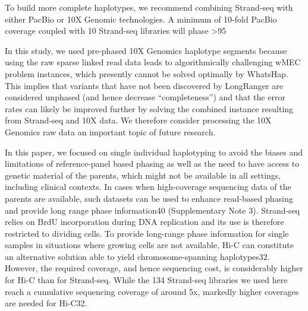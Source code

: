 	To build more complete haplotypes, we recommend combining Strand-seq with either PacBio or 10X Genomic technologies. A minimum of 10-fold PacBio coverage coupled with 10 Strand-seq libraries will phase >95%

	In this study, we used pre-phased 10X Genomics haplotype segments because using the raw sparse linked read data leads to algorithmically challenging wMEC problem instances, which presently cannot be solved optimally by WhatsHap. This implies that variants that have not been discovered by LongRanger are considered unphased (and hence decrease “completeness”) and that the error rates can likely be improved further by solving the combined instance resulting from Strand-seq and 10X data. We therefore consider processing the 10X Genomics raw data an important topic of future research.

	In this paper, we focused on single individual haplotyping to avoid the biases and limitations of reference-panel based phasing as well as the need to have access to genetic material of the parents, which might not be available in all settings, including clinical contexts. In cases when high-coverage sequencing data of the parents are available, such datasets can be used to enhance read-based phasing and provide long range phase information40 (Supplementary Note 3).  
	Strand-seq relies on BrdU incorporation during DNA replication and its use is therefore restricted to dividing cells. To provide long-range phase information for single samples in situations where growing cells are not available, Hi-C can constitute an alternative solution able to yield chromosome-spanning haplotypes32. However, the required coverage, and hence sequencing cost, is considerably higher for Hi-C than for Strand-seq. While the 134 Strand-seq libraries we used here reach a cumulative sequencing coverage of around 5x, markedly higher coverages are needed for Hi-C32. 
	
